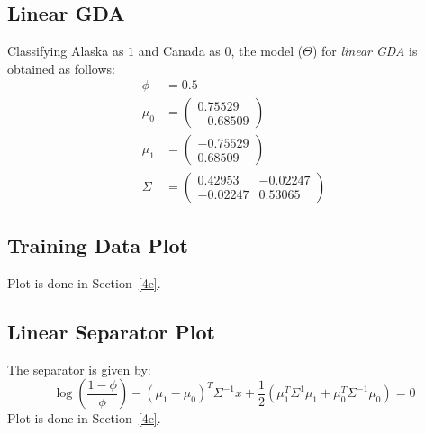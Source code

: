 \documentclass[11pt]{article}
\begin{document}
\subsection{Linear GDA}
Classifying Alaska as $1$ and Canada as $0$, the model ($\Theta$) for \textit{linear GDA} is obtained as follows:
\begin{equation}
    \begin{split}
        \phi &= 0.5\\
        \mu_0 &=
        \begin{pmatrix}
            0.75529\\
            -0.68509
        \end{pmatrix}\\
        \mu_1 &=
        \begin{pmatrix}
            -0.75529\\
            0.68509
        \end{pmatrix}\\
        \Sigma &=
        \begin{pmatrix}
            0.42953 & -0.02247\\
            -0.02247 & 0.53065
        \end{pmatrix}
    \end{split}
\end{equation}

\subsection{Training Data Plot}
Plot is done in Section~\ref{4e}.

\subsection{Linear Separator Plot}
The separator is given by:
\begin{equation}
    \log\left(\displaystyle\frac{1-\phi}{\phi}\right) - (\mu_1-\mu_0)^T\Sigma^{-1}x + \frac{1}{2}\left(\mu_1^T\Sigma^{1}\mu_1+\mu_0^T\Sigma^{-1}\mu_0\right)=0 %
\end{equation}
Plot is done in Section~\ref{4e}.
\end{document}
